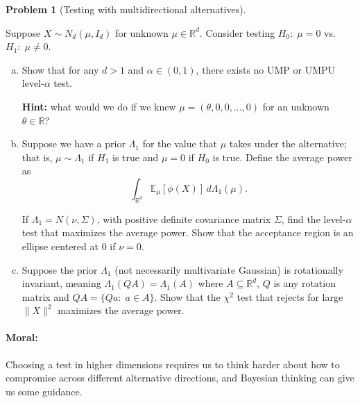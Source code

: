 \documentclass{article}
\newcommand{\EE}{\mathbb{E}}
\newcommand{\RR}{\mathbb{R}}
\theoremstyle{definition}
\newtheorem{problem}{Problem}
\begin{document}
\begin{problem}[Testing with multidirectional alternatives]
\label{prob:test-multidir}

Suppose $X\sim N_d(\mu,I_d)$ for unknown $\mu\in\RR^d$. Consider testing $H_0:\; \mu=0$ vs. $H_1:\; \mu \neq 0$.

\begin{enumerate}[(a)]


\item Show that for any $d>1$ and $\alpha\in(0,1)$, there exists no UMP or UMPU level-$\alpha$ test.

{\bf Hint:} what would we do if we knew $\mu = (\theta,0,0,\ldots,0)$ for an unknown $\theta\in\RR$?




\item Suppose we have a prior $\Lambda_1$ for the value that $\mu$ takes under the alternative; that is, $\mu \sim \Lambda_1$ if $H_1$ is true and $\mu = 0$ if $H_0$ is true. Define the average power as
\[
\int_{\RR^d} \EE_\mu [\phi(X)] \,d\Lambda_1(\mu).
\]

If $\Lambda_1 = N(\nu, \Sigma)$, with positive definite covariance matrix $\Sigma$, find the level-$\alpha$ test that maximizes the average power. Show that the acceptance region is an ellipse centered at $0$ if $\nu = 0$.



\item Suppose the prior $\Lambda_1$ (not necessarily multivariate Gaussian) is rotationally invariant, meaning $\Lambda_1(Q A) = \Lambda_1(A)$ where $A \subseteq \RR^d$, $Q$ is any rotation matrix and $QA = \{Qa:\; a\in A\}$. Show that the $\chi^2$ test that rejects for large $\|X\|^2$ maximizes the average power.

  
\end{enumerate}

\paragraph{Moral:} Choosing a test in higher dimensions requires us to think harder about how to compromise across different alternative directions, and Bayesian thinking can give us some guidance.
\end{problem}






\end{document}
